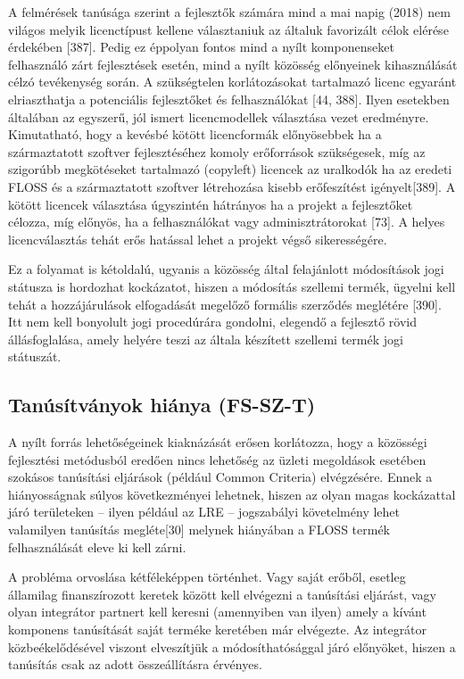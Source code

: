 \documentclass[12pt,magyar,a4paper,oneside]{scrreprt}
\begin{document}
A felmérések tanúsága szerint a fejlesztők számára mind a mai napig
(2018) nem világos melyik licenctípust kellene választaniuk az általuk
favorizált célok elérése érdekében {[}387{]}. Pedig ez éppolyan fontos
mind a nyílt komponenseket felhasználó zárt fejlesztések esetén, mind a
nyílt közösség előnyeinek kihasználását célzó tevékenység során. A
szükségtelen korlátozásokat tartalmazó licenc egyaránt elriaszthatja a
potenciális fejlesztőket és felhasználókat {[}44, 388{]}. Ilyen
esetekben általában az egyszerű, jól ismert licencmodellek választása
vezet eredményre. Kimutatható, hogy a kevésbé kötött licencformák
előnyösebbek ha a származtatott szoftver fejlesztéséhez komoly
erőforrások szükségesek, míg az szigorúbb megkötéseket tartalmazó
(copyleft) licencek az uralkodók ha az eredeti FLOSS és a származtatott
szoftver létrehozása kisebb erőfeszítést igényelt{[}389{]}. A kötött
licencek választása úgyszintén hátrányos ha a projekt a fejlesztőket
célozza, míg előnyös, ha a felhasználókat vagy adminisztrátorokat
{[}73{]}. A helyes licencválasztás tehát erős hatással lehet a projekt
végső sikerességére.

Ez a folyamat is kétoldalú, ugyanis a közösség által felajánlott
módosítások jogi státusza is hordozhat kockázatot, hiszen a módosítás
szellemi termék, ügyelni kell tehát a hozzájárulások elfogadását
megelőző formális szerződés meglétére {[}390{]}. Itt nem kell bonyolult
jogi procedúrára gondolni, elegendő a fejlesztő rövid állásfoglalása,
amely helyére teszi az általa készített szellemi termék jogi státuszát.

\hypertarget{sec:FS-SZ-T}{%
\subsection{Tanúsítványok hiánya (FS-SZ-T)}\label{sec:FS-SZ-T}}

A nyílt forrás lehetőségeinek kiaknázását erősen korlátozza, hogy a
közösségi fejlesztési metódusból eredően nincs lehetőség az üzleti
megoldások esetében szokásos tanúsítási eljárások (például Common
Criteria) elvégzésére. Ennek a hiányosságnak súlyos következményei
lehetnek, hiszen az olyan magas kockázattal járó területeken -- ilyen
például az LRE -- jogszabályi követelmény lehet valamilyen tanúsítás
megléte{[}30{]} melynek hiányában a FLOSS termék felhasználását eleve ki
kell zárni.

A probléma orvoslása kétféleképpen történhet. Vagy saját erőből, esetleg
államilag finanszírozott keretek között kell elvégezni a tanúsítási
eljárást, vagy olyan integrátor partnert kell keresni (amennyiben van
ilyen) amely a kívánt komponens tanúsítását saját terméke keretében már
elvégezte. Az integrátor közbeékelődésével viszont elveszítjük a
módosíthatósággal járó előnyöket, hiszen a tanúsítás csak az adott
összeállításra érvényes.
\end{document}
